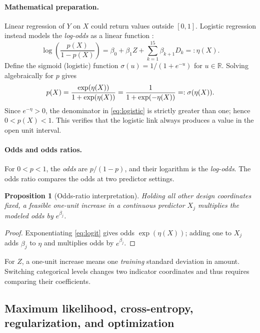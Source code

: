 \documentclass[11pt,a4paper]{article}
\newtheorem{proposition}{Proposition}[section]\newtheorem{remark}{Remark}[section]
\begin{document}
\paragraph{Mathematical preparation.} Linear regression of $Y$ on $X$ could return values outside $[0,1]$. Logistic regression instead models the \emph{log-odds} as a linear function \cite[Ch.~4]{james2023}:
\begin{equation}\label{eq:logit}
\log\!\left(\frac{p(X)}{1-p(X)}\right)=\beta_0+\beta_1 Z+\sum_{k=1}^{15}\beta_{k+1}D_k=:\eta(X).
\end{equation}
Define the sigmoid (logistic) function $\sigma(u)=1/(1+e^{-u})$ for $u\in\mathbb R$. Solving algebraically for $p$ gives
\begin{equation}\label{eq:logistic}p(X)=\frac{\exp(\eta(X))}{1+\exp(\eta(X))}=\frac{1}{1+\exp(-\eta(X))}=: \sigma(\eta(X)).\end{equation}
Since $e^{-\eta}>0$, the denominator in \eqref{eq:logistic} is strictly greater than one; hence $0<p(X)<1$. This verifies that the logistic link always produces a value in the open unit interval.
\paragraph{Odds and odds ratios.}
For $0<p<1$, the \emph{odds} are $p/(1-p)$, and their logarithm is the \emph{log-odds}. The odds ratio compares the odds at two predictor settings.
\begin{proposition}[Odds-ratio interpretation]Holding all other design coordinates fixed, a feasible one-unit increase in a continuous predictor $X_j$ multiplies the modeled odds by $e^{\beta_j}$.\end{proposition}
\begin{proof}Exponentiating \eqref{eq:logit} gives odds $\exp(\eta(X))$; adding one to $X_j$ adds $\beta_j$ to $\eta$ and multiplies odds by $e^{\beta_j}$.\end{proof}
For $Z$, a one-unit increase means one \emph{training} standard deviation in amount. Switching categorical levels changes two indicator coordinates and thus requires comparing their coefficients.

\subsection{Maximum likelihood, cross-entropy, regularization, and optimization}
\end{document}
